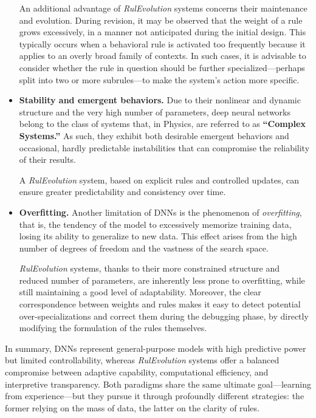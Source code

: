 \documentclass[12pt,a4paper]{article}
\begin{document}
\begin{itemize}
An additional advantage of \textit{RulEvolution} systems concerns their maintenance and evolution.  
During revision, it may be observed that the weight of a rule grows excessively, in a manner not anticipated during the initial design.  
This typically occurs when a behavioral rule is activated too frequently because it applies to an overly broad family of contexts.  
In such cases, it is advisable to consider whether the rule in question should be further specialized—perhaps split into two or more subrules—to make the system’s action more specific.   

    \item \textbf{Stability and emergent behaviors.}  
    Due to their nonlinear and dynamic structure and the very high number of parameters, deep neural networks belong to the class of systems that, in Physics, are referred to as \textbf{“Complex Systems.”}  
    As such, they exhibit both desirable emergent behaviors and occasional, hardly predictable instabilities that can compromise the reliability of their results.  

    A \textit{RulEvolution} system, based on explicit rules and controlled updates, can ensure greater predictability and consistency over time.

    \item \textbf{Overfitting.}  
    Another limitation of DNNs is the phenomenon of \textit{overfitting}, that is, the tendency of the model to excessively memorize training data, losing its ability to generalize to new data.  
    This effect arises from the high number of degrees of freedom and the vastness of the search space.  


    \textit{RulEvolution} systems, thanks to their more constrained structure and reduced number of parameters, are inherently less prone to overfitting, while still maintaining a good level of adaptability.  
	Moreover, the clear correspondence between weights and rules makes it easy to detect potential over-specializations and correct them during the debugging phase, by directly modifying the formulation of the rules themselves.

\end{itemize}

In summary, DNNs represent general-purpose models with high predictive power but limited controllability, whereas \textit{RulEvolution} systems offer a balanced compromise between adaptive capability, computational efficiency, and interpretive transparency.  
Both paradigms share the same ultimate goal—learning from experience—but they pursue it through profoundly different strategies: the former relying on the mass of data, the latter on the clarity of rules.
\end{document}
